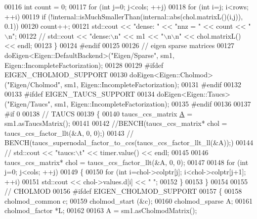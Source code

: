 \begin{DoxyCode}
{{00116       \textcolor{keywordtype}{int} count = 0;
00117       \textcolor{keywordflow}{for} (\textcolor{keywordtype}{int} j=0; j<cols; ++j)
00118         \textcolor{keywordflow}{for} (\textcolor{keywordtype}{int} i=j; i<rows; ++i)
00119           \textcolor{keywordflow}{if} (!internal::isMuchSmallerThan(internal::abs(chol.matrixL()(i,j)), 0.1))
00120             count++;
00121       std::cout << \textcolor{stringliteral}{"dense: "} << \textcolor{stringliteral}{"nnz = "} << count << \textcolor{stringliteral}{"\(\backslash\)n"};
00122 \textcolor{comment}{//       std::cout << "dense:\(\backslash\)n" << m1 << "\(\backslash\)n\(\backslash\)n" << chol.matrixL() << endl;}
00123     \}
00124 \textcolor{preprocessor}{    #endif}
00125 
00126     \textcolor{comment}{// eigen sparse matrices}
00127     doEigen<Eigen::DefaultBackend>(\textcolor{stringliteral}{"Eigen/Sparse"}, sm1, Eigen::IncompleteFactorization);
00128 
00129 \textcolor{preprocessor}{    #ifdef EIGEN\_CHOLMOD\_SUPPORT}
00130     doEigen<Eigen::Cholmod>(\textcolor{stringliteral}{"Eigen/Cholmod"}, sm1, Eigen::IncompleteFactorization);
00131 \textcolor{preprocessor}{    #endif}
00132 
00133 \textcolor{preprocessor}{    #ifdef EIGEN\_TAUCS\_SUPPORT}
00134     doEigen<Eigen::Taucs>(\textcolor{stringliteral}{"Eigen/Taucs"}, sm1, Eigen::IncompleteFactorization);
00135 \textcolor{preprocessor}{    #endif}
00136 
00137 \textcolor{preprocessor}{    #if 0}
00138     \textcolor{comment}{// TAUCS}
00139     \{
00140       taucs\_ccs\_matrix \hyperlink{group___core___module_class_eigen_1_1_matrix}{A} = sm1.asTaucsMatrix();
00141 
00142       \textcolor{comment}{//BENCH(taucs\_ccs\_matrix* chol = taucs\_ccs\_factor\_llt(&A, 0, 0);)}
00143 \textcolor{comment}{//       BENCH(taucs\_supernodal\_factor\_to\_ccs(taucs\_ccs\_factor\_llt\_ll(&A));)}
00144 \textcolor{comment}{//       std::cout << "taucs:\(\backslash\)t" << timer.value() << endl;}
00145 
00146       taucs\_ccs\_matrix* chol = taucs\_ccs\_factor\_llt(&A, 0, 0);
00147 
00148       \textcolor{keywordflow}{for} (\textcolor{keywordtype}{int} j=0; j<cols; ++j)
00149       \{
00150         \textcolor{keywordflow}{for} (\textcolor{keywordtype}{int} i=chol->colptr[j]; i<chol->colptr[j+1]; ++i)
00151           std::cout << chol->values.d[i] << \textcolor{stringliteral}{" "};
00152       \}
00153     \}
00154 
00155     \textcolor{comment}{// CHOLMOD}
00156 \textcolor{preprocessor}{    #ifdef EIGEN\_CHOLMOD\_SUPPORT}
00157     \{
00158       cholmod\_common c;
00159       cholmod\_start (&c);
00160       cholmod\_sparse A;
00161       cholmod\_factor *L;
00162 
00163       A = sm1.asCholmodMatrix();
}}
\end{DoxyCode}
